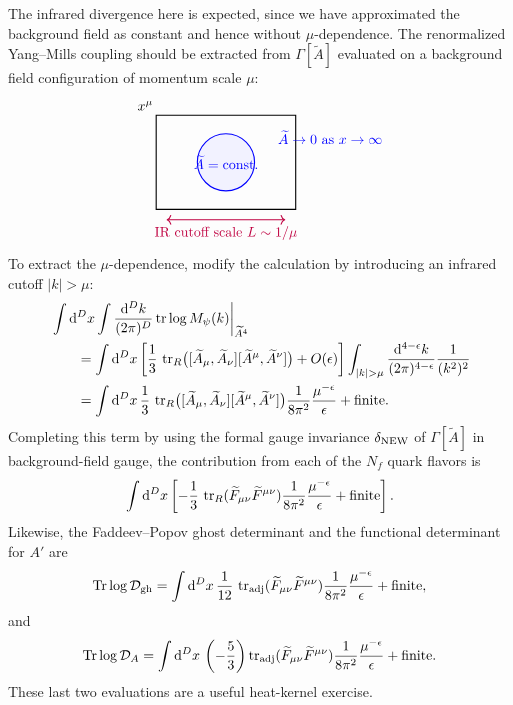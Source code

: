 The infrared divergence here is expected, since we have approximated the
background field as constant and hence without \(\mu\)-dependence.  The
renormalized Yang--Mills coupling should be extracted from
\(\Gamma[\widetilde A]\) evaluated on a background field configuration of
momentum scale \(\mu\):
\[
\begin{tikzpicture}[scale=0.88,baseline={(0,-0.15)}]
  \draw[thick] (-2.0,-1.35) rectangle (2.0,1.35);
  \draw[blue,thick,fill=blue!5] (0,0) circle (0.82);
  \node[blue] at (0,0) {\(\widetilde A=\mathrm{const.}\)};
  \node[blue,right] at (1.35,0.72) {\(\widetilde A\to0\) as \(x\to\infty\)};
  \draw[<->,purple,thick] (-1.7,-1.65) -- (1.7,-1.65);
  \node[purple] at (0,-2.03) {IR cutoff scale \(L\sim 1/\mu\)};
  \node[above left] at (-1.95,1.35) {\(x^\mu\)};
\end{tikzpicture}
\]
To extract the \(\mu\)-dependence, modify the calculation by introducing
an infrared cutoff \(|k|>\mu\):
\[
\begin{aligned}
  &\left.
  \int\dd^D x
  \int\frac{\dd^Dk}{(2\pi)^D}
  \operatorname{tr}\log M_\psi(k)
  \right|_{\widetilde A^4}
\\
  &\qquad =
  \int\dd^Dx
  \left[
    \frac13\,
    \operatorname{tr}_{R}
    \bigl(
      [\widetilde A_\mu,\widetilde A_\nu]
      [\widetilde A^\mu,\widetilde A^\nu]
    \bigr)
    +O(\epsilon)
  \right]
  \int_{|k|>\mu}
  \frac{\dd^{4-\epsilon}k}{(2\pi)^{4-\epsilon}}
  \frac1{(k^2)^2}
\\
  &\qquad =
  \int\dd^Dx\,
  \frac13\,
  \operatorname{tr}_{R}
  \bigl(
    [\widetilde A_\mu,\widetilde A_\nu]
    [\widetilde A^\mu,\widetilde A^\nu]
  \bigr)
  \frac{1}{8\pi^2}\frac{\mu^{-\epsilon}}{\epsilon}
  +\hbox{finite}.
\end{aligned}
\]
Completing this term by using the formal gauge invariance
\(\delta_{\rm NEW}\) of \(\Gamma[\widetilde A]\) in background-field
gauge, the contribution from each of the \(N_f\) quark flavors is
\[
  \int\mathrm{d}^Dx
  \left[
    -\frac13\,
    \operatorname{tr}_{R}
    (\widetilde F_{\mu\nu}\widetilde F^{\mu\nu})
    \frac{1}{8\pi^2}\frac{\mu^{-\epsilon}}{\epsilon}
    +\hbox{finite}
  \right].
\]
Likewise, the Faddeev--Popov ghost determinant and the functional
determinant for \(A'\) are
\[
  \operatorname{Tr}\log\mathcal D_{\rm gh}
  =
  \int\mathrm{d}^Dx\,
  \frac{1}{12}\,
  \operatorname{tr}_{\rm adj}
  (\widetilde F_{\mu\nu}\widetilde F^{\mu\nu})
  \frac{1}{8\pi^2}\frac{\mu^{-\epsilon}}{\epsilon}
  +\hbox{finite},
\]
and
\[
  \operatorname{Tr}\log\mathcal D_A
  =
  \int\mathrm{d}^Dx\,
  \left(-\frac53\right)
  \operatorname{tr}_{\rm adj}
  (\widetilde F_{\mu\nu}\widetilde F^{\mu\nu})
  \frac{1}{8\pi^2}\frac{\mu^{-\epsilon}}{\epsilon}
  +\hbox{finite}.
\]
These last two evaluations are a useful heat-kernel exercise.

